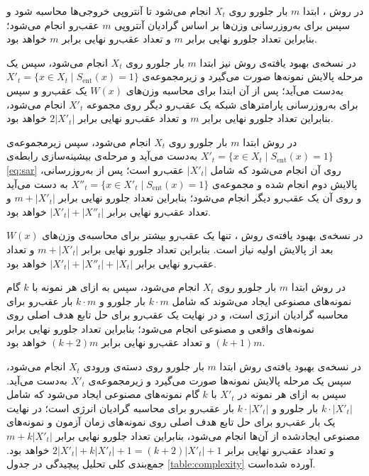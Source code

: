 در روش ، ابتدا $m$ بار جلورو روی $X_t$ انجام می‌شود تا آنتروپی خروجی‌ها محاسبه شود و سپس برای به‌روزرسانی وزن‌ها بر اساس گرادیان آنتروپی $m$ عقب‌رو انجام می‌شود؛ بنابراین تعداد جلورو نهایی برابر $m$ و تعداد عقب‌رو نهایی برابر $m$ خواهد بود.  

در نسخه‌ی بهبود یافته‌ی روش  نیز ابتدا $m$ بار جلورو روی $X_t$ انجام می‌شود، سپس یک مرحله پالایش نمونه‌ها صورت می‌گیرد و زیرمجموعه‌ی $X'_t = \{ x \in X_t \mid S_{\mathrm{ent}}(x) = 1\}$ به‌دست می‌آید؛ پس از آن ابتدا برای محاسبه وزن‌های $W(x)$ یک عقب‌رو و سپس برای به‌روزرسانی پارامترهای شبکه یک عقب‌رو دیگر روی مجموعه $X'_t$ انجام می‌شود، بنابراین تعداد جلورو نهایی برابر $m$ و تعداد عقب‌رو نهایی برابر $2 |X'_t|$ خواهد بود.  

در روش  ابتدا $m$ بار جلورو روی $X_t$ انجام می‌شود، سپس زیرمجموعه‌ی $X'_t = \{ x \in X_t \mid S_{\mathrm{ent}}(x) = 1\}$ به‌دست می‌آید و مرحله‌ی بیشینه‌سازی رابطه‌ی \ref{eq:sar} روی آن انجام می‌شود که شامل $|X'_t|$ عقب‌رو است؛ پس از به‌روزرسانی، پالایش دوم انجام شده و مجموعه‌ی $X''_t = \{ x \in X'_t \mid S_{\mathrm{ent}}(x) = 1\}$ به دست می‌آید و روی آن یک عقب‌رو دیگر انجام می‌شود؛ بنابراین تعداد جلورو نهایی برابر $m + |X'_t|$ و تعداد عقب‌رو نهایی برابر $|X'_t| + |X''_t|$ خواهد بود.  

در نسخه‌ی بهبود یافته‌ی روش ، تنها یک عقب‌رو بیشتر برای محاسبه‌ی وزن‌های $W(x)$ بعد از پالایش اولیه نیاز است. بنابراین تعداد جلورو نهایی برابر $m + |X'_t|$ و تعداد عقب‌رو نهایی برابر $|X'_t| + |X''_t| + |X_t|$ خواهد بود.  

در روش  ابتدا $m$ بار جلورو روی $X_t$ انجام می‌شود، سپس به ازای هر نمونه با $k$ گام  نمونه‌های مصنوعی ایجاد می‌شوند که شامل $k \cdot m$ بار جلورو و $k \cdot m$ بار عقب‌رو برای محاسبه گرادیان انرژی است، و در نهایت یک عقب‌رو برای حل تابع هدف اصلی روی نمونه‌های واقعی و مصنوعی انجام می‌شود؛ بنابراین تعداد جلورو نهایی برابر $(k+1) m$ و تعداد عقب‌رو نهایی برابر $(k+2) m$ خواهد بود.  

در نسخه‌ی بهبود یافته‌ی روش  ابتدا $m$ بار جلورو روی دسته‌ی ورودی $X_t$ انجام می‌شود، سپس یک مرحله پالایش نمونه‌ها صورت می‌گیرد و زیرمجموعه‌ی $X'_t$ به‌دست می‌آید. سپس به ازای هر نمونه در $X'_t$ با $k$ گام  نمونه‌های مصنوعی ایجاد می‌شود که شامل $k \cdot |X'_t|$ بار جلورو و $k \cdot |X'_t|$ بار عقب‌رو برای محاسبه گرادیان انرژی است؛ در نهایت یک بار عقب‌رو برای حل تابع هدف اصلی روی نمونه‌های زمان آزمون و نمونه‌های مصنوعی ایجادشده از آن‌ها انجام می‌شود، بنابراین تعداد جلورو نهایی برابر $m + k|X'_t|$ و تعداد عقب‌رو نهایی برابر $2 |X'_t| + k|X'_t| + 1 = (k+2)|X'_t| + 1$ خواهد بود. جمع‌بندی کلی تحلیل پیچیدگی در جدول \ref{table:complexity} آورده شده‌است.


